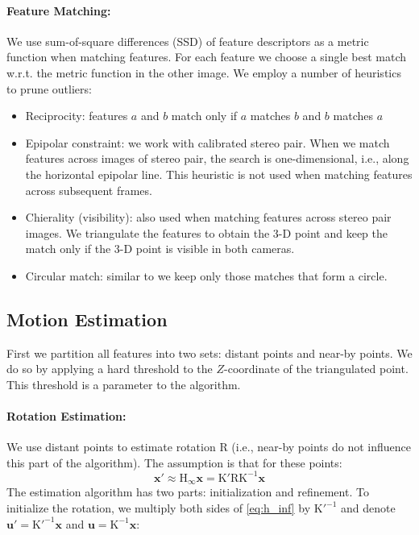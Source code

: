 \documentclass{bmvc2k}
\begin{document}
\noindent
\paragraph{Feature Matching:} We use sum-of-square differences (SSD)
of feature descriptors as a metric function when matching
features. For each feature we choose a single best match w.r.t. the
metric function in the other image. We employ a number of heuristics
to prune outliers:
\begin{itemize}
\item Reciprocity: features $a$ and $b$ match only if $a$ matches $b$
  and $b$ matches $a$
\item Epipolar constraint: we work with calibrated stereo pair.  When
  we match features across images of stereo pair, the search is
  one-dimensional, i.e., along the horizontal epipolar line.  This
  heuristic is not used when matching features across subsequent
  frames.
\item Chierality (visibility): also used when matching features across
  stereo pair images.  We triangulate the features to obtain the 3-D
  point and keep the match only if the 3-D point is visible in both
  cameras.
\item Circular match: similar to \cite{Geiger2011} we keep only those
  matches that form a circle.
\end{itemize}

\subsection{Motion Estimation}

First we partition all features into two sets: distant points and
near-by points.  We do so by applying a hard threshold to the
$Z$-coordinate of the triangulated point.  This threshold is a
parameter to the algorithm.

\paragraph{Rotation Estimation:} We use distant points to estimate
rotation $\mathrm{R}$ (i.e., near-by points do not influence this part
of the algorithm). The assumption is that for these points:
\begin{equation}\label{eq:h_inf}
\mathbf{x}' \approx \mathrm{H}_\infty\mathbf{x} = \mathrm{K'RK^{-1}}\mathbf{x}
\end{equation}
The estimation algorithm has two parts: initialization and
refinement. To initialize the rotation, we multiply both sides of
\ref{eq:h_inf} by $\mathrm{K'^{-1}}$ and denote $\mathbf{u'} =
\mathrm{K'^{-1}}\mathbf{x}$ and $\mathbf{u} =
\mathrm{K^{-1}}\mathbf{x}$:
\end{document}
